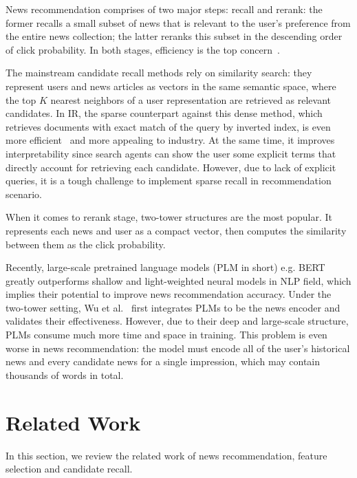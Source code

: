 \documentclass[sigconf,anonymous]{acmart}
\begin{document}
News recommendation comprises of two major steps: recall and rerank: the former recalls a small subset of news that is relevant to the user's preference from the entire news collection; the latter reranks this subset in the descending order of click probability. In both stages, efficiency is the top concern~\cite{liu_Hifi-ark,LightRec,Octopus}.

The mainstream candidate recall methods rely on similarity search: they represent users and news articles as vectors in the same semantic space, where the top $K$ nearest neighbors of a user representation are retrieved as relevant candidates. In IR, the sparse counterpart against this dense method, which retrieves documents with exact match of the query by inverted index, is even more efficient~\cite{sparse_and_dense_recall} and more appealing to industry. At the same time, it improves interpretability since search agents can show the user some explicit terms that directly account for retrieving each candidate. However, due to lack of explicit queries, it is a tough challenge to implement sparse recall in recommendation scenario.

When it comes to rerank stage, two-tower structures are the most popular. It represents each news and user as a compact vector, then computes the similarity between them as the click probability. 



Recently, large-scale pretrained language models (PLM in short) e.g. BERT~\cite{Bert} greatly outperforms shallow and light-weighted neural models in NLP field, which implies their potential to improve news recommendation accuracy. Under the two-tower setting, Wu et al.~\cite{wu_newsPLM} first integrates PLMs to be the news encoder and validates their effectiveness. However, due to their deep and large-scale structure, PLMs consume much more time and space in training. This problem is even worse in news recommendation: the model must encode all of the user's historical news and every candidate news for a single impression, which may contain thousands of words in total.





\section{Related Work}
\label{section:related work}
In this section, we review the related work of news recommendation, feature selection and candidate recall.
\end{document}
